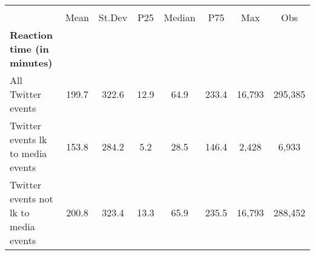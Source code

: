 {
\def\sym#1{\ifmmode^{#1}\else\(^{#1}\)\fi}
\begin{tabular}{l*{1}{ccccccc}}
\hline\hline
                    &\multicolumn{7}{c}{}                                                                      \\
                    &        Mean&      St.Dev&         P25&      Median&         P75&         Max&         Obs\\
\hline
\textbf{Reaction time (in minutes)}&            &            &            &            &            &            &            \\
All Twitter events  &       199.7&       322.6&        12.9&        64.9&       233.4&      16,793&     295,385\\
Twitter events lk to media events&       153.8&       284.2&         5.2&        28.5&       146.4&       2,428&       6,933\\
Twitter events not lk to media events&       200.8&       323.4&        13.3&        65.9&       235.5&      16,793&     288,452\\
\hline\hline
\end{tabular}
}

